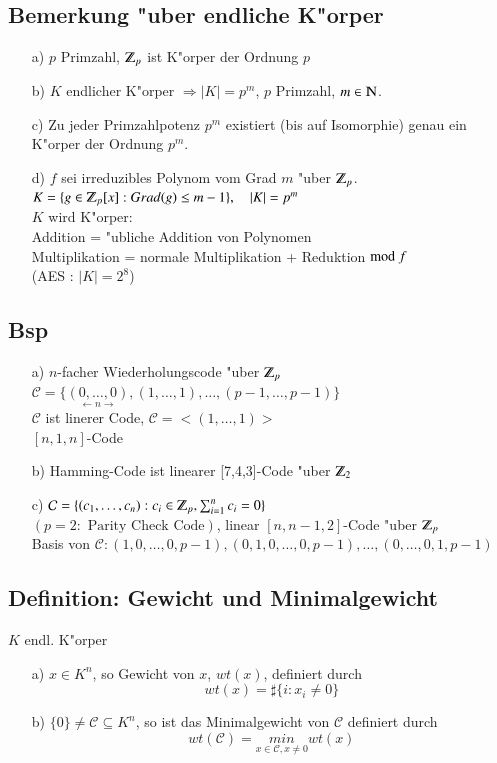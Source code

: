 \subsection{Bemerkung "uber endliche K"orper}
\begin{itemize}
	\item[a)] $p$ Primzahl, $\Z_p$ ist K"orper der Ordnung $p$
	\item[b)] $K$ endlicher K"orper $\Rightarrow \left| K \right| = p^m$, $p$ Primzahl, $m \in \N$.
	\item[c)] Zu jeder Primzahlpotenz $p^m$ existiert (bis auf Isomorphie) genau ein K"orper der Ordnung $p^m$.
	\item[d)] $f$ sei irreduzibles Polynom vom Grad $m$ "uber $\Z_p$.\\
	 $K=\lbrace g \in \Z_p [x] : Grad(g) \leq m-1 \rbrace, \quad \left| K \right| = p^m$\\
	$K$ wird K"orper:\\
	Addition = "ubliche Addition von Polynomen \\
	Multiplikation = normale Multiplikation + Reduktion $\text{mod }f$ \\
	(AES : $\left| K \right| = 2^8$)
\end{itemize}

\subsection{Bsp}
\begin{itemize}
	\item[a)] $n$-facher Wiederholungscode "uber $\Z_p$\\
	$\mathcal{C}=\lbrace \underset{\longleftarrow n \longrightarrow}{(0,\ldots,0)},(1,\ldots,1),\ldots,(p-1,\ldots,p-1)\rbrace$\\
	$\mathcal{C}$ ist linerer Code, $\mathcal{C}=<(1,\ldots,1)>$\\
	$[n,1,n]$-Code
	\item[b)] Hamming-Code ist linearer [7,4,3]-Code "uber $\Z_2$
	\item[c)] $\mathcal{C} = \lbrace (c_1,\ldots,c_n) : c_i \in \Z_p,\sum^n_{i=1}{c_i}=0 \rbrace$ \\
	$(p=2 : \text{ Parity Check Code})$, linear $[n,n-1,2]$-Code "uber $\Z_p$\\
	Basis von $\mathcal{C}:(1,0,\ldots,0,p-1), (0,1,0,\ldots,0,p-1), \ldots, (0,\ldots,0,1,p-1)$
\end{itemize}
\subsection{Definition: Gewicht und Minimalgewicht}
$K$ endl. K"orper
\begin{itemize}
	\item[a)] $x \in K^n$, so Gewicht von $x$, $wt(x)$, definiert durch 
	\[
		wt(x)=\sharp \lbrace i:x_i\neq0 \rbrace
	\]
	\item[b)] $\lbrace 0 \rbrace \neq \mathcal{C} \subseteq K^n$, so ist das Minimalgewicht von $\mathcal{C}$ definiert durch 
	\[
		wt(\mathcal{C})=\underset{x\in\mathcal{C}, x\neq 0}{min} wt(x)
	\]
\end{itemize}

